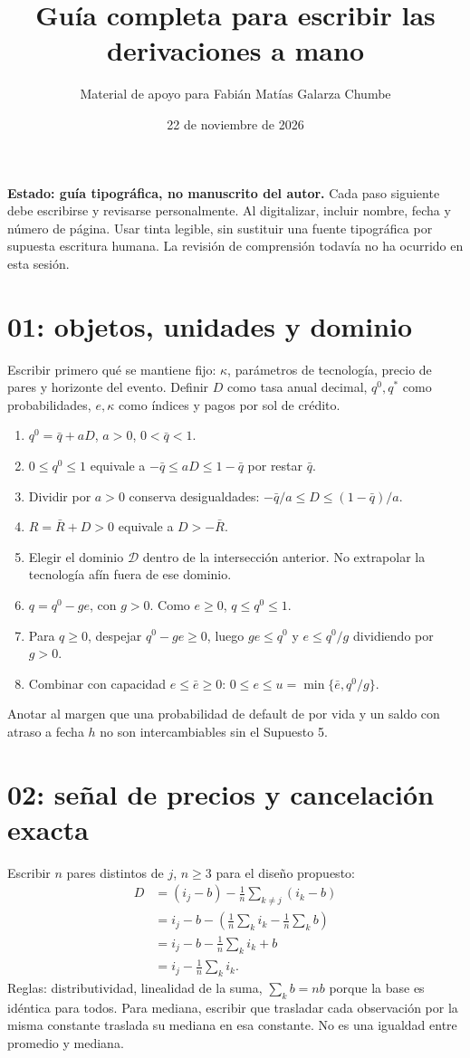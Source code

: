 \documentclass[11pt]{article}
\title{Guía completa para escribir las derivaciones a mano}
\author{Material de apoyo para Fabián Matías Galarza Chumbe}
\date{22 de noviembre de 2026}
\begin{document}
\maketitle
\noindent\textbf{Estado: guía tipográfica, no manuscrito del autor.}
Cada paso siguiente debe escribirse y revisarse personalmente. Al digitalizar,
incluir nombre, fecha y número de página. Usar tinta legible, sin sustituir
una fuente tipográfica por supuesta escritura humana. La revisión de
comprensión todavía no ha ocurrido en esta sesión.

\section{01: objetos, unidades y dominio}
Escribir primero qué se mantiene fijo: $\kappa$, parámetros de tecnología,
precio de pares y horizonte del evento. Definir $D$ como tasa anual decimal,
$q^0,q^*$ como probabilidades, $e,\kappa$ como índices y pagos por sol de crédito.
\begin{enumerate}
\item $q^0=\bar q+aD$, $a>0$, $0<\bar q<1$.
\item $0\le q^0\le1$ equivale a $-\bar q\le aD\le1-\bar q$ por restar $\bar q$.
\item Dividir por $a>0$ conserva desigualdades:
$-\bar q/a\le D\le(1-\bar q)/a$.
\item $R=\bar R+D>0$ equivale a $D>-\bar R$.
\item Elegir el dominio $\mathcal D$ dentro de la intersección anterior.
No extrapolar la tecnología afín fuera de ese dominio.
\item $q=q^0-ge$, con $g>0$. Como $e\ge0$, $q\le q^0\le1$.
\item Para $q\ge0$, despejar $q^0-ge\ge0$, luego $ge\le q^0$ y
$e\le q^0/g$ dividiendo por $g>0$.
\item Combinar con capacidad $e\le\bar e\ge0$:
$0\le e\le u=\min\{\bar e,q^0/g\}$.
\end{enumerate}
Anotar al margen que una probabilidad de default de por vida y un saldo con
atraso a fecha $h$ no son intercambiables sin el Supuesto 5.

\section{02: señal de precios y cancelación exacta}
Escribir $n$ pares distintos de $j$, $n\ge3$ para el diseño propuesto:
\begin{align*}
D&=(i_j-b)-\frac1n\sum_{k\ne j}(i_k-b)\\
 &=i_j-b-\left(\frac1n\sum_k i_k-\frac1n\sum_k b\right)\\
 &=i_j-b-\frac1n\sum_k i_k+b\\
 &=i_j-\frac1n\sum_k i_k.
\end{align*}
Reglas: distributividad, linealidad de la suma, $\sum_k b=nb$ porque la base
es idéntica para todos. Para mediana, escribir que trasladar cada observación
por la misma constante traslada su mediana en esa constante. No es una
igualdad entre promedio y mediana.
\end{document}
